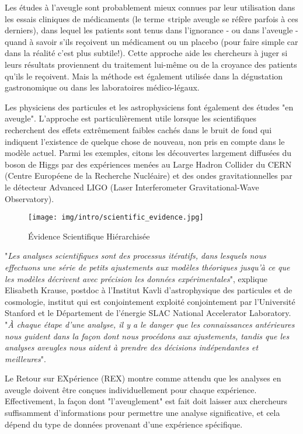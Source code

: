 	Les études à l'aveugle sont probablement mieux connues par leur utilisation dans les essais cliniques de médicaments (le terme «triple aveugle se réfère parfois à ces derniers), dans lequel les patients sont tenus dans l'ignorance - ou dans l'aveugle - quand à savoir s'ils reçoivent un médicament ou un placebo (pour faire simple car dans la réalité c'est plus subtile!). Cette approche aide les chercheurs à juger si leurs résultats proviennent du traitement lui-même ou de la croyance des patients qu'ils le reçoivent. Mais la méthode est également utilisée dans la dégustation gastronomique ou dans les laboratoires médico-légaux.
	
	Les physiciens des particules et les astrophysiciens font également des études "en aveugle". L'approche est particulièrement utile lorsque les scientifiques recherchent des effets extrêmement faibles cachés dans le bruit de fond qui indiquent l'existence de quelque chose de nouveau, non pris en compte dans le modèle actuel. Parmi les exemples, citons les découvertes largement diffusées du boson de Higgs par des expériences menées au Large Hadron Collider du CERN (Centre Européene de la Recherche Nucléaire) et des ondes gravitationnelles par le détecteur Advanced LIGO (Laser Interferometer Gravitational-Wave Observatory).
	\begin{figure}[H]
		\centering
		\texttt{[image: img/intro/scientific\_evidence.jpg]}
		\caption{Évidence Scientifique Hiérarchisée}
	\end{figure}
	"\textit{Les analyses scientifiques sont des processus itératifs, dans lesquels nous effectuons une série de petits ajustements aux modèles théoriques jusqu'à ce que les modèles décrivent avec précision les données expérimentales}", explique Elisabeth Krause, postdoc à l'Institut Kavli d'astrophysique des particules et de cosmologie, institut qui est conjointement exploité conjointement par l'Université Stanford et le Département de l'énergie SLAC National Accelerator Laboratory. "\textit{À chaque étape d'une analyse, il y a le danger que les connaissances antérieures nous guident dans la façon dont nous procédons aux ajustements, tandis que les analyses aveugles nous aident à prendre des décisions indépendantes et meilleures}".
	
	Le Retour sur EXpérience (REX) montre comme attendu que les analyses en aveugle doivent être conçues individuellement pour chaque expérience. Effectivement, la façon dont "l'aveuglement" est fait doit laisser aux chercheurs suffisamment d'informations pour permettre une analyse significative, et cela dépend du type de données provenant d'une expérience spécifique.

